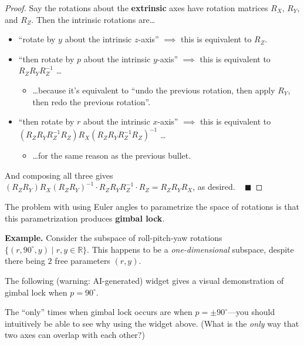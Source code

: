 \begin{proof}
    Say the rotations about the \textbf{extrinsic} axes
    have rotation matrices $R_X$, $R_Y$, and $R_Z$.
    Then the intrinsic rotations are\dots
    \begin{itemize}
        \item ``rotate by $y$ about the intrinsic $z$-axis''
        $\implies$ this is equivalent to $R_Z$.
        \item ``then rotate by $p$ about the intrinsic $y$-axis''
        $\implies$ this is equivalent to $R_ZR_YR_Z^{-1}$ \dots
        \begin{itemize}
            \item \dots because it's equivalent to
            ``undo the previous rotation,
            then apply $R_Y$, then redo the previous rotation''.
        \end{itemize}
        \item ``then rotate by $r$ about the intrinsic $x$-axis''
        $\implies$ this is equivalent to
        $(R_ZR_YR_Z^{-1}R_Z)R_X(R_ZR_YR_Z^{-1}R_Z)^{-1}$ \dots
        \begin{itemize}
            \item \dots for the same reason as the previous bullet.
        \end{itemize}
    \end{itemize}
    And composing all three gives
    $(R_ZR_Y)R_X(R_ZR_Y)^{-1} \cdot R_ZR_YR_Z^{-1} \cdot R_Z = R_ZR_YR_X$,
    as desired. ~ $\blacksquare$
\end{proof}

The problem with using Euler angles
to parametrize the space of rotations
is that this parametrization produces \textbf{gimbal lock}.

\textbf{Example.}
Consider the subspace of roll-pitch-yaw rotations
$\{(r, 90^{\circ}, y) \mid r, y \in \mathbb{R}\}$.
This happens to be a \emph{one-dimensional} subspace,
despite there being $2$ free parameters $(r, y)$.

The following (warning: AI-generated) widget
gives a visual demonstration of gimbal lock when $p = 90^{\circ}$.


\begin{remark}
    The ``only'' times when gimbal lock occurs
    are when $p = \pm 90^{\circ}$---you should
    intuitively be able to see why using the widget above.
    (What is the \emph{only} way that
    two axes can overlap with each other?)
\end{remark}

